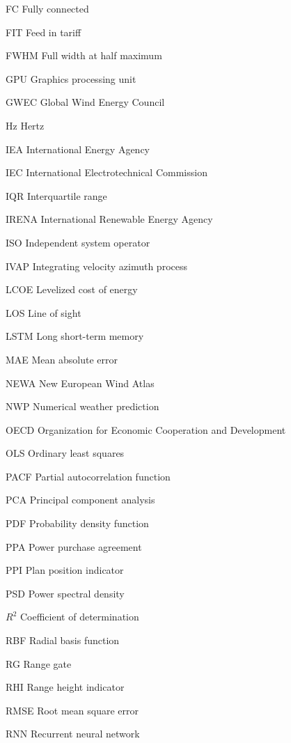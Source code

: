 \begin{abbreviations}
\item[FC] Fully connected 
\item[FIT] Feed in tariff
\item[FWHM] Full width at half maximum

\item[GPU] Graphics processing unit
\item[GWEC] Global Wind Energy Council

\item[Hz] Hertz

\item[IEA] International Energy Agency
\item[IEC] International Electrotechnical Commission
\item[IQR] Interquartile range
\item[IRENA] International Renewable Energy Agency
\item[ISO] Independent system operator
\item[IVAP] Integrating velocity azimuth process

\item[LCOE] Levelized cost of energy
\item[LOS] Line of sight
\item[LSTM] Long short-term memory

\item[MAE] Mean absolute error

\item[NEWA] New European Wind Atlas
\item[NWP] Numerical weather prediction

\item[OECD] Organization for Economic Cooperation and Development
\item[OLS] Ordinary least squares 

\item[PACF] Partial autocorrelation function
\item[PCA] Principal component analysis
\item[PDF] Probability density function
\item[PPA] Power purchase agreement
\item[PPI] Plan position indicator
\item[PSD] Power spectral density

\item[$R^2$] Coefficient of determination
\item[RBF] Radial basis function
\item[RG] Range gate
\item[RHI] Range height indicator
\item[RMSE] Root mean square error
\item[RNN] Recurrent neural network


\end{abbreviations}
